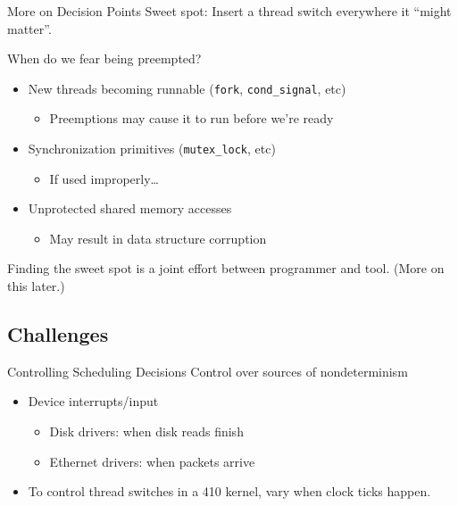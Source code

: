 \documentclass[xcolor=dvipsnames]{beamer}
\begin{document}
\begin{frame}{More on Decision Points}
	Sweet spot: Insert a thread switch everywhere it ``might matter''.

	\linegap
	When do we fear being preempted?
	\begin{itemize}
		\item New threads becoming runnable (\texttt{fork}, \texttt{cond\_signal}, etc)
			\begin{itemize}
				\item Preemptions may cause it to run before we're ready
			\end{itemize}
		\item Synchronization primitives (\texttt{mutex\_lock}, etc)
			\begin{itemize}
				\item If used improperly\ldots
			\end{itemize}
		\item Unprotected shared memory accesses %
			\begin{itemize}
				\item May result in data structure corruption
			\end{itemize}
	\end{itemize}
	\linegap

	Finding the sweet spot is a joint effort between programmer and tool. (More on this later.)
\end{frame}

\subsection{Challenges}

\begin{frame}{Controlling Scheduling Decisions}
	Control over sources of nondeterminism
	\begin{itemize}
		\item Device interrupts/input
			\begin{itemize}
				\item Disk drivers: when disk reads finish
				\item Ethernet drivers: when packets arrive
			\end{itemize}
		\item To control thread switches in a 410 kernel, vary when clock ticks happen.
	\end{itemize}
\end{frame}
\end{document}
